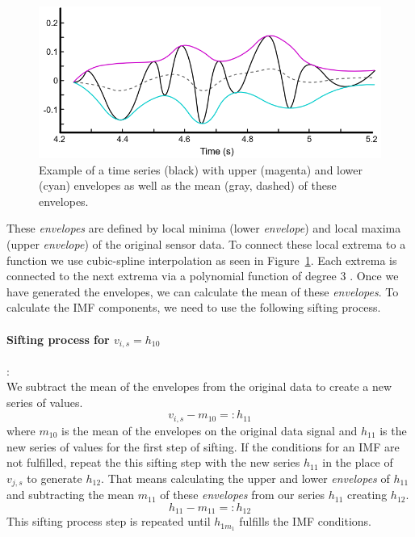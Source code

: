 \begin{figure}[ht]
	\centering
	\includegraphics[width=\textwidth]{gfx/EMD_envelopes2.PNG}
	\caption{Example of a time series (black) with upper (magenta) and lower (cyan) envelopes as well as the mean (gray, dashed) of these envelopes.}
	\label{fig:EMD_envelopes}
\end{figure}
These \textit{envelopes} are defined by local minima (lower \textit{envelope}) and local maxima (upper \textit{envelope}) of the original sensor data. To connect these local extrema to a function we use cubic-spline interpolation as seen in Figure~\ref{fig:EMD_envelopes}. Each extrema is connected to the next extrema via a polynomial function of degree 3 \cite{DBLP:journals/computing/Gfrerer82}.  
Once we have generated the envelopes, we can calculate the mean of these \textit{envelopes}. To calculate the IMF components, we need to use the following sifting process.
\paragraph{Sifting process for $v_{i,s} = h_{10}$}:\\
We subtract the mean of the envelopes from the original data to create a new series of values.
\begin{equation}
	 v_{i,s} - m_{10} =: h_{11}
\end{equation}
where $m_{10}$ is the mean of the envelopes on the original data signal and $h_{11}$ is the new series of values for the first step of sifting.
If the conditions for an IMF are not fulfilled, repeat the this sifting step with the new series $h_{11}$ in the place of $v_{j,s}$ to generate $h_{12}$. That means calculating the upper and lower \textit{envelopes} of $h_{11}$ and subtracting the mean $m_{11}$ of these \textit{envelopes} from our series $h_{11}$ creating $h_{12}$.
\begin{equation}
	h_{11} - m_{11} =: h_{12}
\end{equation}
This sifting process step is repeated until $h_{1m_1}$ fulfills the IMF conditions.
